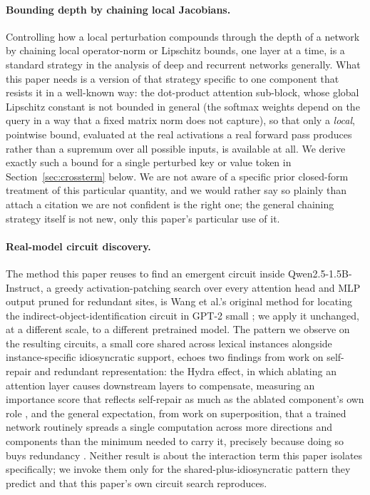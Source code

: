 \documentclass[11pt,a4paper]{article}
\begin{document}
\paragraph{Bounding depth by chaining local Jacobians.} Controlling how a
local perturbation compounds through the depth of a network by chaining
local operator-norm or Lipschitz bounds, one layer at a time, is a standard
strategy in the analysis of deep and recurrent networks generally. What this
paper needs is a version of that strategy specific to one component that
resists it in a well-known way: the dot-product attention sub-block, whose
global Lipschitz constant is not bounded in general (the softmax weights
depend on the query in a way that a fixed matrix norm does not capture), so
that only a \emph{local}, pointwise bound, evaluated at the real activations
a real forward pass produces rather than a supremum over all possible
inputs, is available at all. We derive exactly such a bound for a single
perturbed key or value token in Section~\ref{sec:crossterm} below. We are not
aware of a specific prior closed-form treatment of this particular
quantity, and we would rather say so plainly than attach a citation we are
not confident is the right one; the general chaining strategy itself is not
new, only this paper's particular use of it.

\paragraph{Real-model circuit discovery.} The method this paper reuses to
find an emergent circuit inside Qwen2.5-1.5B-Instruct, a greedy
activation-patching search over every attention head and MLP output pruned
for redundant sites, is Wang et al.'s original method for locating the
indirect-object-identification circuit in GPT-2 small \cite{wang2023}; we
apply it unchanged, at a different scale, to a different pretrained model.
The pattern we observe on the resulting circuits, a small core shared across
lexical instances alongside instance-specific idiosyncratic support, echoes
two findings from work on self-repair and redundant representation: the
Hydra effect, in which ablating an attention layer causes downstream layers
to compensate, measuring an importance score that reflects self-repair as
much as the ablated component's own role \cite{mcgrath2023}, and the general
expectation, from work on superposition, that a trained network routinely
spreads a single computation across more directions and components than the
minimum needed to carry it, precisely because doing so buys redundancy
\cite{elhage2022}. Neither result is about the interaction term this paper
isolates specifically; we invoke them only for the shared-plus-idiosyncratic
pattern they predict and that this paper's own circuit search reproduces.
\end{document}
